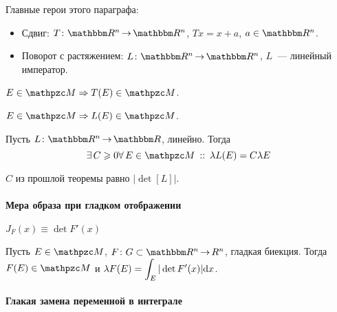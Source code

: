 \documentclass[12pt, timbord]{longnotes}
\begin{document}
Главные герои этого параграфа:

\begin{itemize}[$\bigcirc$]
  \item Сдвиг: $T \colon \R^n \to \R^n$, $Tx = x+a$, $a\in \R^n$.
  \item Поворот с растяжением: $L \colon \R^n \to \R^n$, $L$~--- линейный император.
\end{itemize}

\begin{stat}\label{stat:meas::aff::shiftmeas}
  $E \in \lebesgue \Rightarrow T(E) \in \lebesgue$. 
\end{stat}
\begin{stat}\label{stat:meas::aff::linmeas}
  $E \in \lebesgue \Rightarrow L(E) \in \lebesgue$. 
\end{stat}

\begin{stat}\label{stat:meas::aff::disturb}
  Пусть $L \colon \R^n \to \R$, линейно. Тогда 
  \[
    \exists\, C \geqslant 0 \forall\, E \in \lebesgue \holds \lambda L(E) = C \lambda E
  \]
\end{stat}

\begin{thrm}\label{thrm:meas::aff::deter}
  $C$ из прошлой теоремы равно $\bigl|\det [L]\bigr|$.
\end{thrm}

\paragraph{Мера образа при гладком отображении}
\label{par:meas::smoothimgmeas}

{\denot $J_F(x) \equiv \det F'(x)$}

\begin{thrm}\label{thrm:meas::smoothimgmeas}
  Пусть $E \in \lebesgue$, $F \colon G \subset \R^n \to R^n$, гладкая биекция.
  Тогда $F(E) \in \lebesgue$ и $\lambda F(E) = \displaystyle\int_E |\det F'(x) |\mathrm{d} x$.
\end{thrm}
\begin{tproof}
  \sour\underdev
\end{tproof}


\paragraph{Глакая замена переменной в интеграле}
\label{par:meas::smoothvarch}
\end{document}
